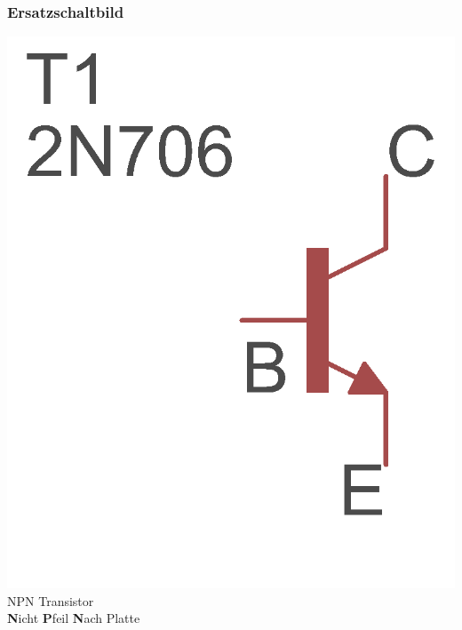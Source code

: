 \begin{frame}
\frametitle{Ersatzschaltbild}

\begin{minipage}{0.4\textwidth}
	\includegraphics[scale=1.4]{e13/NPN.png}\\
	NPN Transistor\\
    \textbf{N}icht \textbf{P}feil \textbf{N}ach Platte
\end{minipage}
\hspace{0.5cm}
\begin{minipage}{0.4\textwidth}

\end{minipage}
\end{frame}
